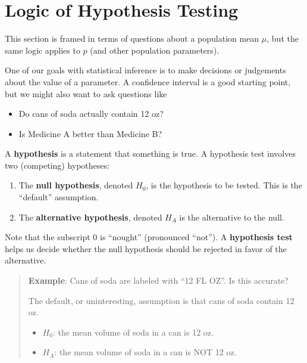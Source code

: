 \documentclass[
]{book}
\providecommand{\tightlist}{%
  \setlength{\itemsep}{0pt}\setlength{\parskip}{0pt}}
\begin{document}
\section{Logic of Hypothesis Testing}\label{logic-of-hypothesis-testing}

This section is framed in terms of questions about a population mean \(\mu\), but the same logic applies to \(p\) (and other population parameters).

One of our goals with statistical inference is to make decisions or judgements about the value of a parameter. A confidence interval is a good starting point, but we might also want to ask questions like

\begin{itemize}
\tightlist
\item
  Do cans of soda actually contain 12 oz?
\item
  Is Medicine A better than Medicine B?
\end{itemize}

A \textbf{hypothesis} is a statement that something is true. A hypothesis test involves two (competing) hypotheses:

\begin{enumerate}
\def\labelenumi{\arabic{enumi}.}
\tightlist
\item
  The \textbf{null hypothesis}, denoted \(H_0\), is the hypothesis to be tested. This is the ``default'' assumption.
\item
  The \textbf{alternative hypothesis}, denoted \(H_A\) is the alternative to the null.
\end{enumerate}

Note that the subscript 0 is ``nought'' (pronounced ``not''). A \textbf{hypothesis test} helps us decide whether the null hypothesis should be rejected in favor of the alternative.

\begin{quote}
\textbf{Example}: Cans of soda are labeled with ``12 FL OZ''. Is this accurate?

The default, or uninteresting, assumption is that cans of soda contain 12 oz.

\begin{itemize}
\tightlist
\item
  \(H_0\): the mean volume of soda in a can is 12 oz.
\item
  \(H_A\): the mean volume of soda in a can is NOT 12 oz.
\end{itemize}
\end{quote}
\end{document}
